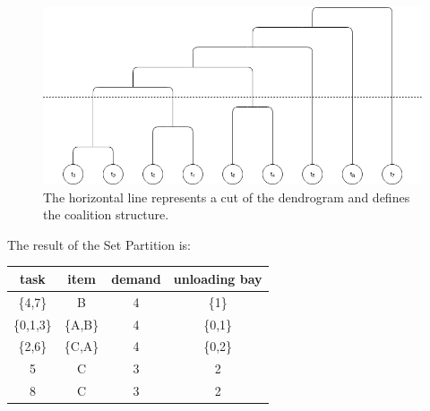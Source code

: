 \begin{figure} [hbt]
    \centering
    \includegraphics[width=\textwidth]{img/CF.png}
    \caption{The horizontal line represents a cut of the dendrogram
    and defines the coalition structure.}
    \label{fig:CF_graph}
\end{figure}

The result of the Set Partition is:

  \begin{center}
    \begin{tabular}{|c|c|c|c|} \hline
    \textbf{task} & \textbf{item} & \textbf{demand} & \textbf{unloading bay} \\ \hline
    \{4,7\}    & B    & 4     & \{1\}             \\
    \{0,1,3\}  & \{A,B\}& 4    & \{0,1\}             \\
    \{2,6\}    & \{C,A\}    & 4  & \{0,2\}             \\
    5    & C    & 3      & 2             \\
    8    & C    & 3      & 2             \\ \hline       
    \end{tabular}
  \end{center}
